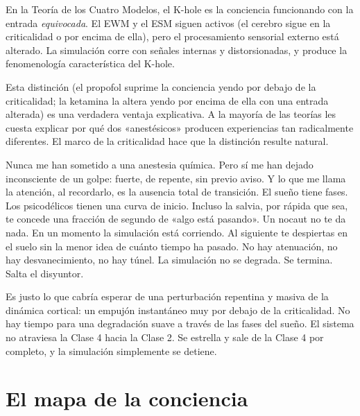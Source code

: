 \documentclass[11pt, twoside, openright]{book}
\begin{document}
En la Teoría de los Cuatro Modelos, el K-hole es la conciencia funcionando con la entrada \textit{equivocada}. El EWM y el ESM siguen activos (el cerebro sigue en la criticalidad o por encima de ella), pero el procesamiento sensorial externo está alterado. La simulación corre con señales internas y distorsionadas, y produce la fenomenología característica del K-hole.

Esta distinción (el propofol suprime la conciencia yendo por debajo de la criticalidad; la ketamina la altera yendo por encima de ella con una entrada alterada) es una verdadera ventaja explicativa. A la mayoría de las teorías les cuesta explicar por qué dos «anestésicos» producen experiencias tan radicalmente diferentes. El marco de la criticalidad hace que la distinción resulte natural.

Nunca me han sometido a una anestesia química. Pero sí me han dejado inconsciente de un golpe: fuerte, de repente, sin previo aviso. Y lo que me llama la atención, al recordarlo, es la ausencia total de transición. El sueño tiene fases. Los psicodélicos tienen una curva de inicio. Incluso la salvia, por rápida que sea, te concede una fracción de segundo de «algo está pasando». Un nocaut no te da nada. En un momento la simulación está corriendo. Al siguiente te despiertas en el suelo sin la menor idea de cuánto tiempo ha pasado. No hay atenuación, no hay desvanecimiento, no hay túnel. La simulación no se degrada. Se termina. Salta el disyuntor.

Es justo lo que cabría esperar de una perturbación repentina y masiva de la dinámica cortical: un empujón instantáneo muy por debajo de la criticalidad. No hay tiempo para una degradación suave a través de las fases del sueño. El sistema no atraviesa la Clase 4 hacia la Clase 2. Se estrella y sale de la Clase 4 por completo, y la simulación simplemente se detiene.

\section*{El mapa de la conciencia}
\end{document}
